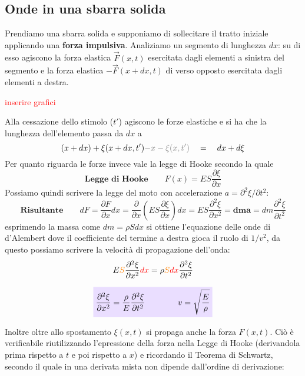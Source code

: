\documentclass[x11names]{article}
\newcommand{\viola}[1]{\colorbox{myred}{$\displaystyle #1$}}
\begin{document}
\newpage
\subsection{Onde in una sbarra solida}
	Prendiamo una sbarra solida  e supponiamo di sollecitare  il tratto iniziale applicando una \textbf{forza impulsiva}. Analiziamo un segmento di lunghezza \(dx\): su di esso agiscono la forza elastica \(\vec{F}(x,t)\)  esercitata dagli elementi a sinistra del segmento e la forza elastica \(-\vec{F}(x + dx,t)\) di verso opposto esercitata dagli elementi a destra.

	\begin{center}
		\textcolor{red}{inserire grafici}
	\end{center}
	
	\noindent
	Alla cessazione dello stimolo (\(t'\)) agiscono le forze elastiche e si ha che la lunghezza dell'elemento passa da \(dx\) a 
	\[ 
	(x + dx) + \xi(x+dx,t') \textcolor{gray}{-x - \xi(x,t') } \quad = \quad dx + d\xi
	\]
	Per quanto riguarda le forze invece vale la legge di Hooke secondo la quale
	\[ 
	\textbf{Legge di Hooke} \qquad	F(x) = ES\frac{\partial\xi}{\partial x}
	\]
	Possiamo quindi scrivere la legge del moto con accelerazione \(a = \partial^2 \xi / \partial t^2\):
	\[ 
	\textbf{Risultante} \qquad	dF = \frac{\partial F}{\partial x}dx = \frac{\partial}{\partial x}\left(ES\frac{\partial\xi}{\partial x}\right)dx = ES\frac{\partial^2\xi}{\partial x^2} \mathbf{= dm a} = dm \frac{\partial^2 \xi}{\partial t^2}
	\]
	esprimendo la massa come \(dm = \rho S dx\) si ottiene l'equazione delle onde di d'Alembert dove il coefficiente del termine a destra gioca il ruolo di \(1/v^2\), da questo possiamo scrivere la velocità di propagazione dell'onda:
	\[ 
	E\textcolor{orange}{S}\frac{\partial^2\xi}{\partial x^2}\textcolor{red}{dx} = \rho \textcolor{orange}{S} \textcolor{red}{dx} \frac{\partial^2 \xi}{\partial t^2}
	\]
	
	
	\begin{equation}
		\viola{\frac{\partial^2\xi}{\partial x^2} = \frac{\rho}{E} \frac{\partial^2 \xi}{\partial t^2} \qquad \qquad v = \sqrt{\frac{E}{\rho}}}
	\end{equation}
	
	
	\noindent
	Inoltre oltre allo spostamento \(\xi(x,t)\) si propaga anche la forza \(F(x,t)\). Ciò è verificabile riutilizzando l'epressione della forza nella Legge di Hooke (derivandola prima rispetto a \(t\) e poi rispetto a \(x\)) e ricordando il Teorema di Schwartz, secondo il quale in una derivata mista non dipende dall'ordine di derivazione:
	
\end{document}
